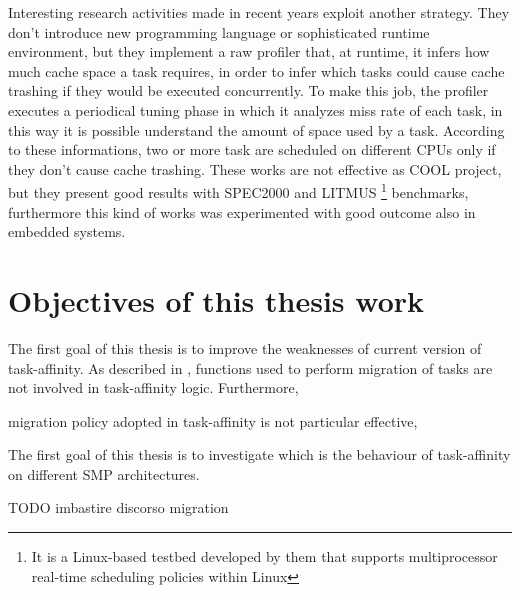 Interesting research activities made in recent years exploit another strategy. They don't introduce new programming language or sophisticated runtime 
environment, but they implement a raw profiler that, at runtime, it infers how much cache space a task requires, in order to infer which 
tasks could cause cache trashing if they would be executed concurrently.
To make this job, the profiler executes a periodical tuning phase in which it analyzes miss rate of each task, in this way it is possible understand the 
amount of space used by a task. According to these informations, two or more
task are scheduled on different CPUs only if 
they don't cause cache trashing. These works are not effective as COOL project, but they present good results with SPEC2000 and 
LITMUS \footnote{It is a Linux-based testbed developed by them that supports multiprocessor real-time scheduling policies within Linux} benchmarks, 
furthermore this kind of works was experimented with good outcome also in embedded systems.


\section{Objectives of this thesis work}
\label{sec:ObjectiveOfThesis}

The first goal of this thesis is to improve the weaknesses of current version of task-affinity. As described in \cite{lcs}, functions used to perform 
migration of tasks are not involved in task-affinity logic. Furthermore, 

migration policy adopted in 
task-affinity is not particular effective, 


The first goal of this thesis is to investigate which is the behaviour of task-affinity on different SMP architectures.

TODO imbastire discorso migration



